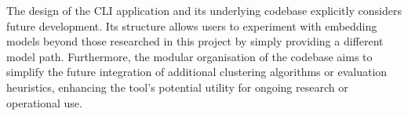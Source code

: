 \documentclass[10pt,oneside]{report}
\begin{document}
The design of the CLI application and its underlying codebase explicitly considers future development. Its structure allows users to experiment with embedding models beyond those researched in this project by simply providing a different model path. Furthermore, the modular organisation of the codebase aims to simplify the future integration of additional clustering algorithms or evaluation heuristics, enhancing the tool's potential utility for ongoing research or operational use.

%
%
%
%
%
%
\end{document}
